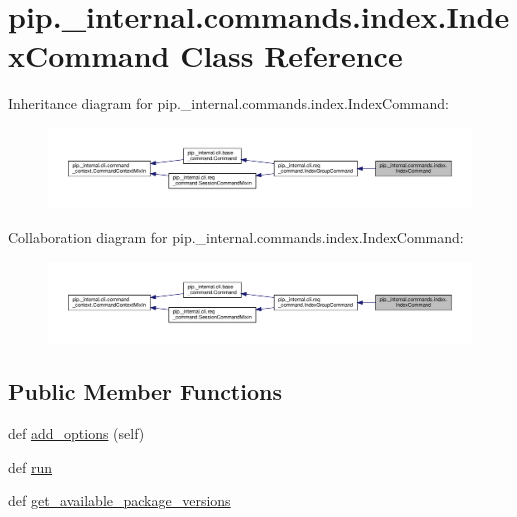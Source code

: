 \hypertarget{classpip_1_1__internal_1_1commands_1_1index_1_1IndexCommand}{}\section{pip.\+\_\+internal.\+commands.\+index.\+Index\+Command Class Reference}
\label{classpip_1_1__internal_1_1commands_1_1index_1_1IndexCommand}


Inheritance diagram for pip.\+\_\+internal.\+commands.\+index.\+Index\+Command\+:
\nopagebreak
\begin{figure}[H]
\begin{center}
\leavevmode
\includegraphics[width=350pt]{classpip_1_1__internal_1_1commands_1_1index_1_1IndexCommand__inherit__graph}
\end{center}
\end{figure}


Collaboration diagram for pip.\+\_\+internal.\+commands.\+index.\+Index\+Command\+:
\nopagebreak
\begin{figure}[H]
\begin{center}
\leavevmode
\includegraphics[width=350pt]{classpip_1_1__internal_1_1commands_1_1index_1_1IndexCommand__coll__graph}
\end{center}
\end{figure}
\subsection*{Public Member Functions}
\begin{DoxyCompactItemize}
\item 
def \hyperlink{classpip_1_1__internal_1_1commands_1_1index_1_1IndexCommand_aa61811ab9946feccb09c27e7e2f601db}{add\+\_\+options} (self)
\item 
def \hyperlink{classpip_1_1__internal_1_1commands_1_1index_1_1IndexCommand_abc668b7a230ea12b4dad8123f405c2c5}{run}
\item 
def \hyperlink{classpip_1_1__internal_1_1commands_1_1index_1_1IndexCommand_a67207da329e5e9e9e3311e6effa116c9}{get\+\_\+available\+\_\+package\+\_\+versions}
\end{DoxyCompactItemize}
